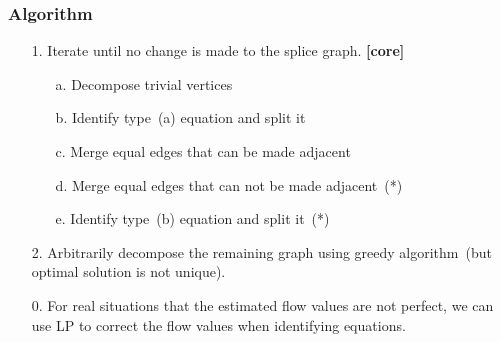 \frame
{
	\frametitle{Algorithm}
	\begin{itemize}
	\item[1.] Iterate until no change is made to the splice graph. {\bf [core]}
		\vspace{0.2cm}
		\begin{itemize}
		\item[a.] Decompose trivial vertices
		\vspace{0.2cm}
		\item[b.] Identify type~(a) equation and split it
		\vspace{0.2cm}
		\item[c.] Merge equal edges that can be made adjacent
		\vspace{0.2cm}
		\item[d.] Merge equal edges that can not be made adjacent~(*)
		\vspace{0.2cm}
		\item[e.] Identify type~(b) equation and split it~(*)
		\vspace{0.2cm}
		\end{itemize}
	\item[2.] Arbitrarily decompose the remaining graph using greedy
		algorithm~(but optimal solution is not unique).

	\vspace{0.2cm}
	\item[0.] For real situations that the estimated flow values are not perfect, 
		we can use LP to correct the flow values when identifying equations.

	\end{itemize}
}

